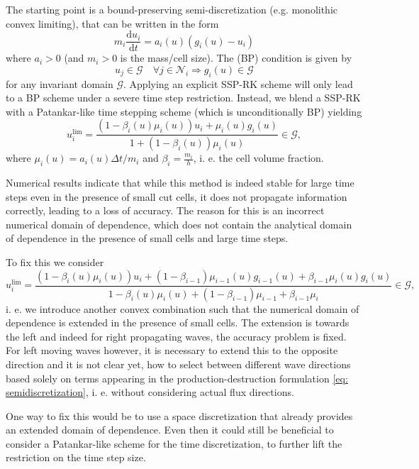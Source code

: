 \documentclass[]{article}
\begin{document}
The starting point is a bound-preserving semi-discretization (e.g. monolithic convex limiting), that can be written in the form
\begin{equation}
	\label{eq: semidiscretization}
m_i \frac{\text{d}u_i}{\text{d}t}=a_i(u)\left(g_i(u)-u_i\right)
\end{equation}
where $a_i>0$ (and $m_i>0$ is the mass/cell size). The (BP) condition is given by $$u_j\in \mathcal{G} \quad \forall j \in \mathcal{N}_i \Rightarrow g_i(u)\in \mathcal{G}$$ for any invariant domain $\mathcal{G}$. Applying an explicit SSP-RK scheme will only lead to a BP scheme under a severe time step restriction. Instead, we blend a SSP-RK with a Patankar-like time stepping scheme (which is unconditionally BP) yielding
$$u_i^{\text{lim}} = \frac{(1-\beta_i(u)\mu_i(u))u_i+\mu_i(u)g_i(u)}{1+(1-\beta_i(u))\mu_i(u)} \in \mathcal{G},$$
where $\mu_i(u) = a_i(u)\Delta t/m_i$  and $\beta_i = \frac{m_i}{h}$, i. e. the cell volume fraction.

Numerical results indicate that while this method is indeed stable for large time steps even in the presence of small cut cells, it does not propagate information correctly, leading to a loss of accuracy. The reason for this is an incorrect numerical domain of dependence, which does not contain the analytical domain of dependence in the presence of small cells and large time steps.

To fix this we consider
$$u_i^{\text{lim}} = \frac{(1-\beta_i(u)\mu_i(u))u_i+ (1 - \beta_{i-1})\mu_{i-1}(u)g_{i-1}(u) +  \beta_{i-1}\mu_i(u)g_i(u)}{1-\beta_i(u)\mu_i(u) + (1 - \beta_{i-1}) \mu_{i-1} + \beta_{i-1} \mu_i} \in \mathcal{G},$$
i. e. we introduce another convex combination such that the numerical domain of dependence is extended in the presence of small cells. The extension is towards the left and indeed for right propagating waves, the accuracy problem is fixed. For left moving waves however, it is necessary to extend this to the opposite direction and it is not clear yet, how to select between different wave directions based solely on terms appearing in the production-destruction formulation \eqref{eq: semidiscretization}, i. e. without considering actual flux directions.

One way to fix this would be to use a space discretization that already provides an extended domain of dependence. Even then it could still be beneficial to consider a Patankar-like scheme for the time discretization, to further lift the restriction on the time step size.
\end{document}
